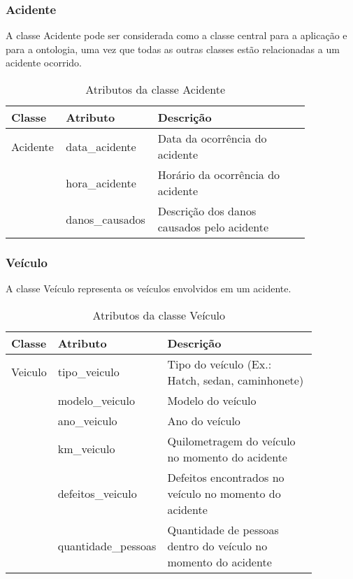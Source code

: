 \subsubsection*{\textbf{Acidente}}

  A classe Acidente pode ser considerada como a classe central para a aplicação e para a ontologia,
  uma vez que todas as outras classes estão relacionadas a um acidente ocorrido.
  
    \begin{table*}[!h]
    \centering
    \begin{tabular}{p{0.15\linewidth}p{0.2\linewidth}p{0.5\linewidth}}
      \hline
      \textbf{Classe} & \textbf{Atributo} & \textbf{Descrição}\\
      \hline
	Acidente & data\_acidente & Data da ocorrência do acidente\\
		 & hora\_acidente & Horário da ocorrência do acidente\\
		 & danos\_causados & Descrição dos danos causados pelo acidente\\
      \hline
    \end{tabular}
    \caption{Atributos da classe Acidente}
    \label{tab:attr_acidente}
    \end{table*}
    
\subsubsection*{\textbf{Veículo}}

  A classe Veículo representa os veículos envolvidos em um acidente.
  
    \begin{table*}[!h]
    \centering
    \begin{tabular}{p{0.15\linewidth}p{0.22\linewidth}p{0.5\linewidth}}
      \hline
      \textbf{Classe} & \textbf{Atributo} & \textbf{Descrição}\\
      \hline
	Veiculo & tipo\_veiculo & Tipo do veículo (Ex.: Hatch, sedan, caminhonete)\\
		& modelo\_veiculo & Modelo do veículo\\
		& ano\_veiculo & Ano do veículo\\		
		& km\_veiculo & Quilometragem do veículo no momento do acidente\\
		& defeitos\_veiculo & Defeitos encontrados no veículo no momento do acidente\\
		& quantidade\_pessoas & Quantidade de pessoas dentro do veículo no momento do acidente\\
      \hline
    \end{tabular}
    \caption{Atributos da classe Veículo}
    \label{tab:attr_veiculo}
    \end{table*}

